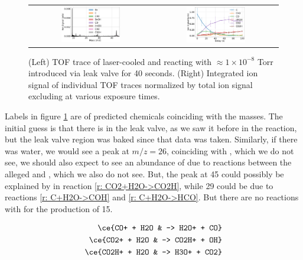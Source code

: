 \begin{figure}[H]
	\label{fig: c + co2 tof traces}
	\centering
	\begin{tabular}{cc}
	\includegraphics[width=0.5\textwidth]{images/C_CO2_TOF.png}
	&
	\includegraphics[width=0.5\textwidth]{images/C_CO2_traces.png}
	\end{tabular}
	\caption{(Left) TOF trace of laser-cooled  and  reacting with $\approx 1 \times 10^{-8}$ Torr  introduced via leak valve for 40 seconds. (Right) Integrated ion signal of individual TOF traces normalized by total ion signal excluding  at various  exposure times.}
\end{figure}

Labels in figure \ref{fig: c + co2 tof traces} are of predicted chemicals coinciding with the masses. The initial guess is that there is  in the leak valve, as we saw it before in the  reaction, but the leak valve region was baked since that data was taken. Similarly, if there was water, we would see a peak at $m/z=26$, coinciding with , which we do not see, we should also expect to see an abundance of  due to reactions between the alleged \ce{[HCO]+} and , which we also do not see. But, the peak at 45 could possibly be explained by  in reaction \ref{r: CO2+H2O->CO2H}, while 29 could be due to reactions \ref{r: C+H2O->COH} and \ref{r: C+H2O->HCO}. But there are no reactions with  for the production of 15.

\begin{align}
	\ce{CO+ + H2O & -> H2O+ + CO} \\
	\ce{CO2+ + H2O & -> CO2H+ + OH} \label{r: CO2+H2O->CO2H} \\
	\ce{CO2H+ + H2O & -> H3O+ + CO2}
\end{align}

